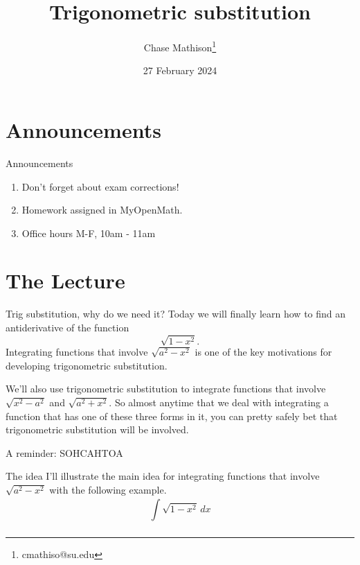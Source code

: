 \documentclass[presentation]{beamer}
\institute[SU]{Shenandoah University}
\author{Chase Mathison\thanks{cmathiso@su.edu}}
\date{27 February 2024}
\title{Trigonometric substitution}
\begin{document}
\maketitle

\section{Announcements}
\label{sec:orgc54cb3b}
\begin{frame}[label={sec:org93365d3}]{Announcements}
\begin{enumerate}
\item Don't forget about exam corrections!
\item Homework assigned in MyOpenMath.
\item Office hours M-F, 10am - 11am
\end{enumerate}
\end{frame}

\section{The Lecture}
\label{sec:org527bc78}
\begin{frame}[label={sec:orgda24b62}]{Trig substitution, why do we need it?}
Today we will finally learn how to find an antiderivative of the
function
\[
\sqrt{1-x^2}. \]
Integrating functions that involve \(\sqrt{a^2-x^2}\) is one of the
key motivations for developing trigonometric substitution.

We'll also use trigonometric substitution to integrate functions that
involve \(\sqrt{x^2-a^2}\) and \(\sqrt{a^2 + x^2}.\) So almost
anytime that we deal with integrating a function that has one of these
three forms in it, you can pretty safely bet that trigonometric
substitution will be involved.
\end{frame}

\begin{frame}[label={sec:org43c7a18}]{A reminder: SOHCAHTOA}
\begin{center}
\end{center}
\end{frame}

\begin{frame}[label={sec:org83b64cd}]{The idea}
I'll illustrate the main idea for integrating functions that involve
\(\sqrt{a^2-x^2}\) with the following example.
\[\int\limits_{}^{} \sqrt{1-x^2}\,dx \]
\vspace{10in}
\end{frame}
\end{document}
